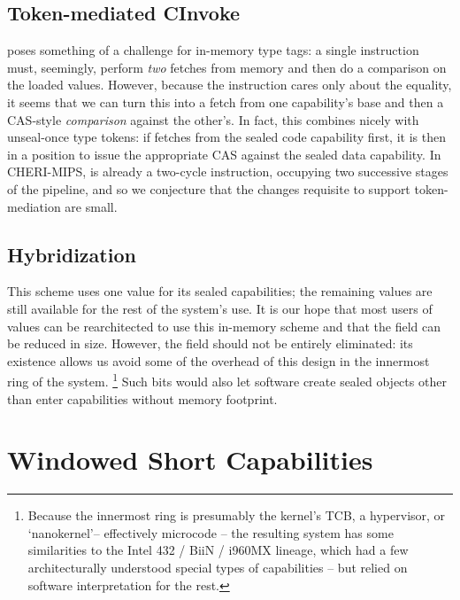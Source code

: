 \subsection{Token-mediated CInvoke} %

 poses something of a challenge for in-memory type tags: a
single instruction must, seemingly, perform \emph{two} fetches from memory
and then do a comparison on the loaded values.  However, because the
instruction cares only about the equality, it seems that we can turn this
into a fetch from one capability's base and then a CAS-style
\emph{comparison} against the other's.  In fact, this combines nicely with
unseal-once type tokens: if  fetches from the sealed code
capability first, it is then in a position to issue the appropriate CAS
against the sealed data capability.  In CHERI-MIPS,  is
already a two-cycle instruction, occupying two successive stages of the
pipeline, and so we conjecture that the changes requisite to support
token-mediation are small.

\subsection{Hybridization} %

This scheme uses one \cotype{} value for its sealed capabilities; the remaining
values are still available for the rest of the system's use.  It is our hope
that most users of \cotype{} values can be rearchitected to use this in-memory
scheme and that the \cotype{} field can be reduced in size.  However, the
\cotype{} field should not be entirely eliminated: its existence allows us avoid
some of the overhead of this design in the innermost ring of the system.%
%
\footnote{Because the innermost ring is presumably the kernel's TCB, a
hypervisor, or `nanokernel'-- effectively microcode -- the resulting system
has some similarities to the Intel 432 / BiiN / i960MX lineage, which had a
few architecturally understood special types of capabilities -- but relied on
software interpretation for the rest.}
%
Such \cotype{} bits would also let software create sealed objects other than
enter capabilities without memory footprint.

\section{Windowed Short Capabilities} %
\label{sec:windowedshortcaps}

